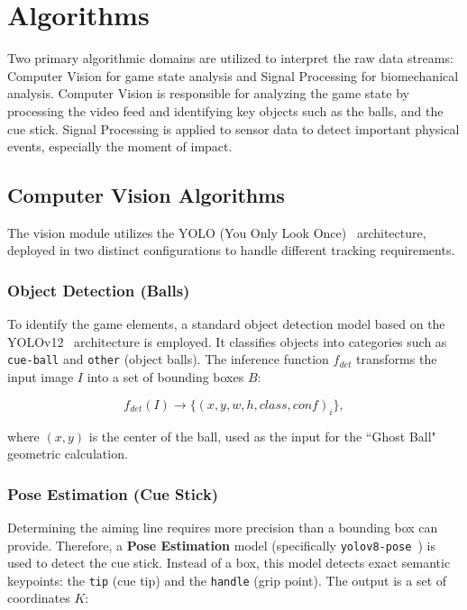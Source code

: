 \section{Algorithms}

Two primary algorithmic domains are utilized to interpret the raw data streams: Computer Vision for game state analysis and Signal Processing for biomechanical analysis. Computer Vision is responsible for analyzing the game state by processing the video feed and identifying key objects such as the balls, and the cue stick. Signal Processing is applied to sensor data to detect important physical events, especially the moment of impact.

\subsection{Computer Vision Algorithms}
The vision module utilizes the YOLO (You Only Look Once)~\cite{bib:yolo} architecture, deployed in two distinct configurations to handle different tracking requirements.

\subsubsection{Object Detection (Balls)}
To identify the game elements, a standard object detection model based on the YOLOv12~\cite{bib:yolo12} architecture is employed. It classifies objects into categories such as \texttt{cue-ball} and \texttt{other} (object balls). The inference function $f_{det}$ transforms the input image $I$ into a set of bounding boxes $B$:

\begin{equation}
    f_{det}(I) \rightarrow \{ (x, y, w, h, class, conf)_i \},
\end{equation}

\noindent where $(x, y)$ is the center of the ball, used as the input for the ``Ghost Ball" geometric calculation.

\subsubsection{Pose Estimation (Cue Stick)}
Determining the aiming line requires more precision than a bounding box can provide. Therefore, a \textbf{Pose Estimation} model (specifically \texttt{yolov8-pose}~\cite{bib:yolov8-ultralytics}) is used to detect the cue stick. Instead of a box, this model detects exact semantic keypoints: the \texttt{tip} (cue tip) and the \texttt{handle} (grip point). The output is a set of coordinates $K$:

